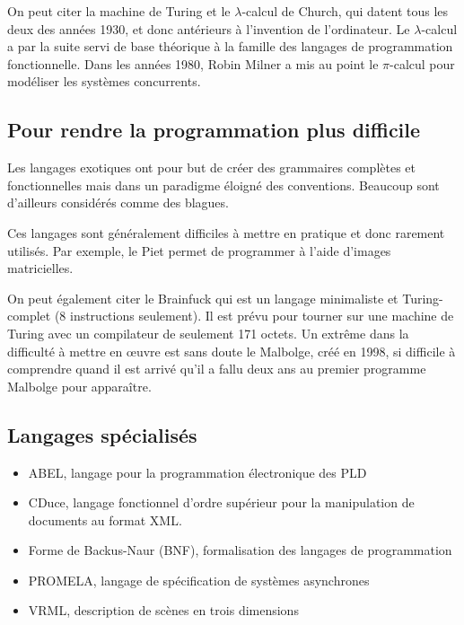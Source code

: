 \documentclass[a4paper,12pt]{article}
\begin{document}
On peut citer la machine de Turing et le $ \lambda $-calcul de Church, qui datent tous les deux des années 1930, et donc antérieurs à l'invention de l'ordinateur. Le $ \lambda $-calcul a par la suite servi de base théorique à la famille des langages de programmation fonctionnelle. Dans les années 1980, Robin Milner a mis au point le $ \pi $-calcul pour modéliser les systèmes concurrents.

\subsection{Pour rendre la programmation plus difficile}

Les langages exotiques ont pour but de créer des grammaires complètes et fonctionnelles mais dans un paradigme éloigné des conventions. Beaucoup sont d'ailleurs considérés comme des blagues.

Ces langages sont généralement difficiles à mettre en pratique et donc rarement utilisés. Par exemple, le Piet permet de programmer à l'aide d'images matricielles.

On peut également citer le Brainfuck qui est un langage minimaliste et Turing-complet (8 instructions seulement). Il est prévu pour tourner sur une machine de Turing avec un compilateur de seulement 171 octets. Un extrême dans la difficulté à mettre en œuvre est sans doute le Malbolge, créé en 1998, si difficile à comprendre quand il est arrivé qu'il a fallu deux ans au premier programme Malbolge pour apparaître.

\subsection{Langages spécialisés}

\begin{itemize}[label=\textbullet]

\item ABEL, langage pour la programmation électronique des PLD
\item CDuce, langage fonctionnel d'ordre supérieur pour la manipulation de documents au format XML.
\item Forme de Backus-Naur (BNF), formalisation des langages de programmation
\item PROMELA, langage de spécification de systèmes asynchrones
\item VRML, description de scènes en trois dimensions

\end{itemize}
\end{document}
